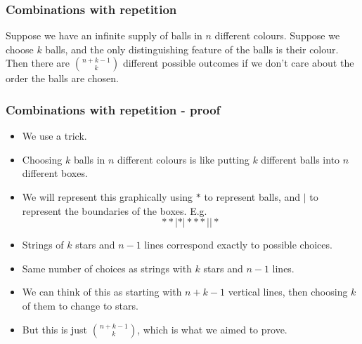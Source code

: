 \documentclass[handout]{beamer}
\begin{document}
\begin{frame}
\frametitle{Combinations with repetition}
\begin{theorem}\label{T:balls}
Suppose we have an infinite supply of balls in $n$ different colours. Suppose we choose $k$ balls, and the only distinguishing feature of the balls is their colour. Then there are ${n+k-1 \choose k}$ different possible outcomes if we don't care about the order the balls are chosen.
\end{theorem}
\end{frame}

\begin{frame}
\frametitle{Combinations with repetition - proof}
\begin{itemize}
\item We use a trick. 
\item Choosing $k$ balls in $n$ different colours is like putting $k$ different balls into $n$ different boxes. 
\item We will represent this graphically using $*$ to represent balls, and $|$ to represent the boundaries of the boxes. E.g.
\[**|*|***||*\]

\item Strings of $k$ stars and $n-1$ lines correspond exactly to possible choices.
\item Same number of choices as strings with $k$ stars and $n-1$ lines. 
\item We can think of this as starting with $n+k-1$ vertical lines, then choosing $k$ of them to change to stars. 
\item But this is just ${n+k -1 \choose k}$, which is what we aimed to prove.
\end{itemize}
\end{frame}
\end{document}
